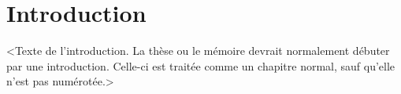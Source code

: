 \chapter*{Introduction}         %
\label{chap:introduction}       %

<Texte de l'introduction. La thèse ou le mémoire devrait normalement
débuter par une introduction. Celle-ci est traitée comme un chapitre
normal, sauf qu'elle n'est pas numérotée.>
